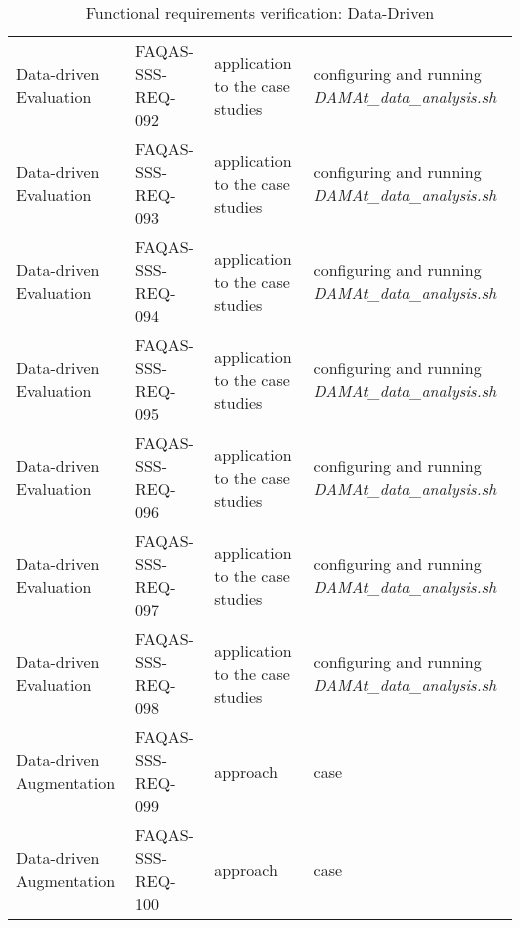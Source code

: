 \begin{table}[h!]
{\begin{tabular}{|l|l|l|l|}
Data-driven Evaluation & FAQAS-SSS-REQ-092 & application to the case studies & configuring and running \emph{DAMAt\_data\_analysis.sh} \\
Data-driven Evaluation & FAQAS-SSS-REQ-093 & application to the case studies & configuring and running \emph{DAMAt\_data\_analysis.sh} \\
Data-driven Evaluation & FAQAS-SSS-REQ-094 & application to the case studies & configuring and running \emph{DAMAt\_data\_analysis.sh} \\
Data-driven Evaluation & FAQAS-SSS-REQ-095 & application to the case studies & configuring and running \emph{DAMAt\_data\_analysis.sh} \\
Data-driven Evaluation & FAQAS-SSS-REQ-096 & application to the case studies & configuring and running \emph{DAMAt\_data\_analysis.sh} \\
Data-driven Evaluation & FAQAS-SSS-REQ-097 & application to the case studies & configuring and running \emph{DAMAt\_data\_analysis.sh} \\
Data-driven Evaluation & FAQAS-SSS-REQ-098 & application to the case studies & configuring and running \emph{DAMAt\_data\_analysis.sh} \\
Data-driven Augmentation & FAQAS-SSS-REQ-099 & approach & case \\
Data-driven Augmentation & FAQAS-SSS-REQ-100 & approach & case \\
\hline
\end{tabular}
  }
\caption{Functional requirements verification: Data-Driven}
\label{tables:data}
\end{table}
